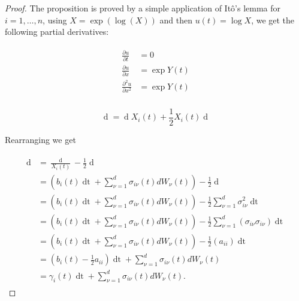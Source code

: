 \documentclass[british]{amsart} \usepackage{lmodern}
\numberwithin{equation}{section} \numberwithin{figure}{section}
\theoremstyle{plain} \newtheorem{thm}{\protect\theoremname}[section]
\theoremstyle{definition} \newtheorem{defn}[thm]{\protect\definitionname}
\theoremstyle{plain} \newtheorem{assumption}[thm]{\protect\assumptionname}
\theoremstyle{plain} \newtheorem{lem}[thm]{\protect\lemmaname}
\theoremstyle{plain} \newtheorem{prop}[thm]{\protect\propositionname}
\theoremstyle{remark} \newtheorem{rem}[thm]{\protect\remarkname}
\theoremstyle{plain} \newtheorem{cor}[thm]{\protect\corollaryname}
\renewcommand{\d}[1]{\mathop{\mathrm{d}{#1}}}
\newcommand{\rangei}{i=1,\dots,n} \newcommand{\measure}{\mathbb{P}}
\begin{document}
\begin{proof}

  The proposition is proved by a simple application of It\^{o}'s lemma for
  $\rangei$, using $X = \exp(\log(X))$ and then $u(t) = \log{X}$, we get 
  the following partial derivatives:

  \begin{gather*}
    \begin{split}
      \frac{\partial u}{\partial t} &= 0 \\
      \frac{\partial u}{\partial x} &= \exp{Y(t)}  \\
      \frac{\partial^2 u}{\partial x^2} &= \exp{Y(t)}  \\
    \end{split}
  \end{gather*}

  \begin{equation*}
      \d{X_{i}(t)} = \d{\log{X_{i}(t)}} X_{i}(t) 
          + \frac{1}{2} X_{i}(t) \d{ \langle \log{X_{i}} \rangle_{t} } 
  \end{equation*}

  Rearranging we get

  \begin{gather*}
    \begin{split}
      \d{\log{X_{i}(t)}} 
&= \frac{\d{X_{i}(t)}}{X_{i}(t)} - \frac{1}{2} \d{ \langle \log{X_{i}} \rangle_{t} } \\
&= \left( b_{i}(t)\d{t} + \sum_{\nu=1}^{d} \sigma_{i\nu}(t) dW_{\nu}(t) \right) - \frac{1}{2} \d{ \langle \log{X_{i}} \rangle_{t} } \\
&= \left( b_{i}(t)\d{t} + \sum_{\nu=1}^{d} \sigma_{i\nu}(t) dW_{\nu}(t) \right) - \frac{1}{2} \sum_{\nu=1}^{d} \sigma_{i\nu}^2\d{t} \\
&= \left( b_{i}(t)\d{t} + \sum_{\nu=1}^{d} \sigma_{i\nu}(t) dW_{\nu}(t)
\right) - \frac{1}{2} \sum_{\nu=1}^{d} \left( \sigma_{i\nu}\sigma_{i\nu} \right) \d{t} \\
&= \left( b_{i}(t)\d{t} + \sum_{\nu=1}^{d} \sigma_{i\nu}(t) dW_{\nu}(t) \right) - \frac{1}{2} \left( a_{ii} \right)\d{t} \\
&= \left( b_{i}(t) - \frac{1}{2}  a_{ii} \right)\d{t} + \sum_{\nu=1}^{d} \sigma_{i\nu}(t) dW_{\nu}(t) \\
&= \gamma_{i}(t) \d{t}  + \sum_{\nu=1}^{d} \sigma_{i\nu}(t) dW_{\nu}(t ).
    \end{split}
  \end{gather*}

\end{proof}
\end{document}
